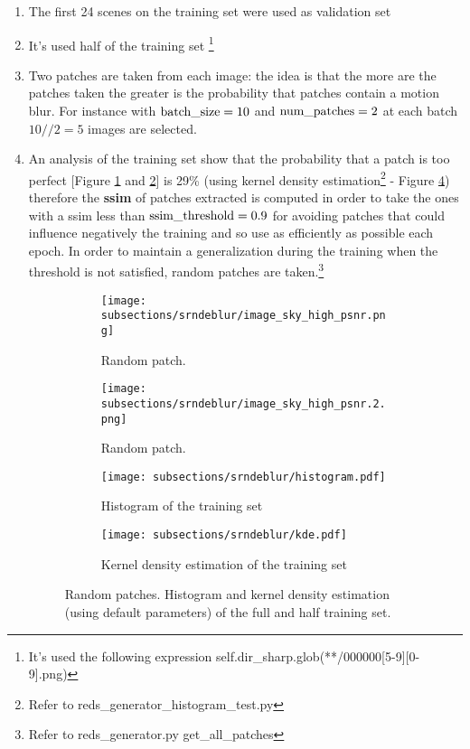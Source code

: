 \begin{enumerate}
    \item The first 24 scenes on the training set were used as validation set
    \item It's used half of the training set \footnote{It's used the following expression self.dir\_sharp.glob(**/000000[5-9][0-9].png)}
    \item Two patches are taken from each image: the idea is that the more are the patches taken the greater is the probability that patches contain a motion blur. For instance with $\textnormal{batch\_size}=10$ and $\textnormal{num\_patches}=2$ at each batch $10//2=5$ images are selected.
    \item An analysis of the training set show that the probability that a patch is too perfect [Figure \ref{high_ssim_patch1} and \ref{high_ssim_patch2}] is 29\% (using kernel density estimation\footnote{Refer to reds\_generator\_histogram\_test.py} - Figure \ref{kde_train}) therefore the \textbf{ssim} of patches extracted is computed in order to take the ones with a ssim less than $\textnormal{ssim\_threshold} = 0.9$ for avoiding patches that could influence negatively the training and so use as efficiently as possible each epoch.
    In order to maintain a generalization during the training when the threshold is not satisfied, random patches are taken.\footnote{Refer to reds\_generator.py get\_all\_patches}

    \begin{figure}[H]
        \centering
        \begin{subfigure}{0.4\textwidth}
            \centering
            \texttt{[image: subsections/srndeblur/image\_sky\_high\_psnr.png]}
            \caption{Random patch.}
            \label{high_ssim_patch1}
        \end{subfigure}
        \centering
        \begin{subfigure}{0.4\textwidth}
            \centering
            \texttt{[image: subsections/srndeblur/image\_sky\_high\_psnr.2.png]}
            \caption{Random patch.}
            \label{high_ssim_patch2}
        \end{subfigure}
        \begin{subfigure}{\textwidth}
            \centering
            \texttt{[image: subsections/srndeblur/histogram.pdf]}
            \caption{Histogram of the training set}
        \end{subfigure}
        \begin{subfigure}{\textwidth}
            \centering
            \texttt{[image: subsections/srndeblur/kde.pdf]}
            \caption{Kernel density estimation of the training set}
            \label{kde_train}
        \end{subfigure}
        \caption{Random patches. Histogram and kernel density estimation (using default parameters) of the full and half training set.}
    \end{figure}
\end{enumerate}

